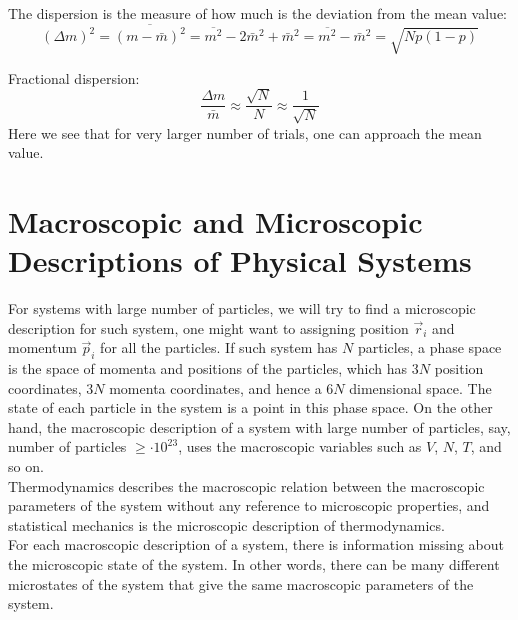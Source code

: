 \documentclass[11pt,oneside]{book}
\theoremstyle{break}
\theoremstyle{break}
\newcommand{\ee}[1]{\cdot 10^{#1}}
\begin{document}
The dispersion is the measure of how much is the deviation from the mean value:
$$(\Delta m)^2 = \overline{(m-\bar{m})^2} = \overline{m^2} - 2\bar{m}^2 + \bar{m}^2 = \overline{m^2} - \bar{m}^2 = \sqrt{Np(1-p)}$$

Fractional dispersion:
$$\frac{\Delta m}{\bar{m}} \approx \frac{\sqrt{N}}{N} \approx \frac{1}{\sqrt{N}} $$
Here we see that for very larger number of trials, one can approach the mean value. 
\newpage

\section[Macroscopic and Microscopic Descriptions of Physical Systems]{\color{red} Macroscopic and Microscopic Descriptions of Physical Systems\color{black}}

For systems with large number of particles, we will try to find a microscopic description for such system, one might want to assigning position $\vec{r}_i$ and momentum $\vec{p}_i$ for all the particles. If such system has $N$ particles, a phase space is the space of momenta and positions of the particles, which has $3N$ position coordinates, $3N$ momenta coordinates, and hence a $6N$ dimensional space. The state of each particle in the system is a point in this phase space. On the other hand, the macroscopic description of a system with large number of particles, say, number of particles $\geq \ee{23}$, uses the macroscopic variables such as $V$, $N$, $T$, and so on.\\

Thermodynamics describes the macroscopic relation between the macroscopic parameters of the system without any reference to microscopic properties, and statistical mechanics is the microscopic description of thermodynamics.\\

For each macroscopic description of a system, there is information missing about the microscopic state of the system. In other words, there can be many different microstates of the system that give the same macroscopic parameters of the system.\\
\end{document}

